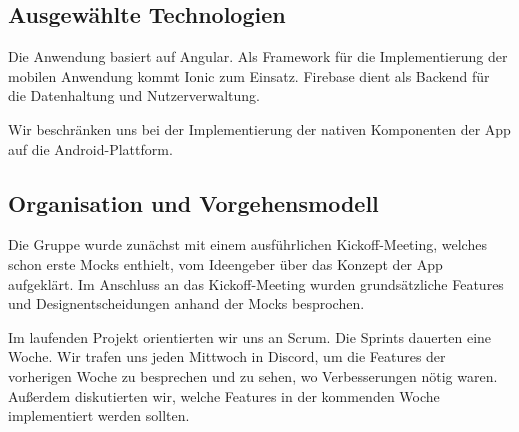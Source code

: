 \subsection{Ausgewählte Technologien}

Die Anwendung basiert auf Angular. Als Framework für die Implementierung der mobilen Anwendung kommt Ionic zum Einsatz. Firebase dient als Backend für die Datenhaltung und Nutzerverwaltung.

Wir beschränken uns bei der Implementierung der nativen Komponenten der App auf die Android-Plattform.

\pagebreak

\subsection{Organisation und Vorgehensmodell}

Die Gruppe wurde zunächst mit einem ausführlichen Kickoff-Meeting, welches schon erste Mocks enthielt, vom Ideengeber über das Konzept der App aufgeklärt. Im Anschluss an das Kickoff-Meeting wurden grundsätzliche Features und Designentscheidungen anhand der Mocks besprochen.

Im laufenden Projekt orientierten wir uns an Scrum. Die Sprints dauerten eine Woche. Wir trafen uns jeden Mittwoch in Discord, um die Features der vorherigen Woche zu besprechen und zu sehen, wo Verbesserungen nötig waren. Außerdem diskutierten wir, welche Features in der kommenden Woche implementiert werden sollten.